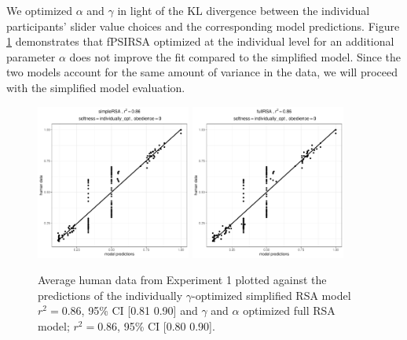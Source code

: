 \documentclass[10pt,a4paper]{article}
\newcommand{\gcs}[1]{\textcolor{blue}{[gcs: #1]}}
\begin{document}
We optimized $\alpha$ and $\gamma$ in light of the KL divergence between the individual participants' slider value choices and the corresponding model predictions.
Figure \ref{simple-full-individual} demonstrates that fPSIRSA optimized at the individual level for an additional parameter $\alpha$ does not improve the fit compared to the simplified model. Since the two models account for the same amount of variance in the data, we will proceed with the simplified model evaluation.







\begin{figure}[ht]
	\centering
	\includegraphics[width=2in]{images/m3.pdf}
	\includegraphics[width=2in]{images/m16.pdf}
	\caption{Average human data from Experiment 1 plotted against the predictions of the individually $\gamma$-optimized simplified RSA model $r^{2}=0.86$, 95\% CI [0.81 0.90] and $\gamma$ and $\alpha$ optimized full RSA model; $r^{2}=0.86$, 95\% CI [0.80 0.90].}\label{simple-full-individual}
\end{figure}
\end{document}
